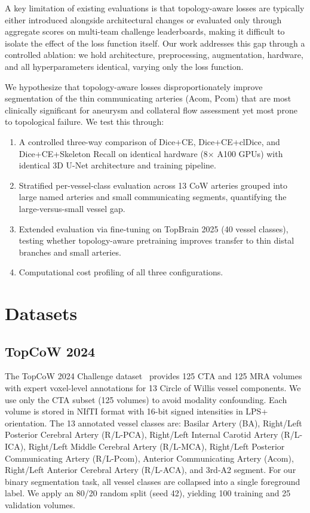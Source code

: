 \documentclass[conference]{IEEEtran}
\begin{document}
A key limitation of existing evaluations is that topology-aware losses are typically either introduced alongside architectural changes or evaluated only through aggregate scores on multi-team challenge leaderboards, making it difficult to isolate the effect of the loss function itself. Our work addresses this gap through a controlled ablation: we hold architecture, preprocessing, augmentation, hardware, and all hyperparameters identical, varying only the loss function.

We hypothesize that topology-aware losses disproportionately improve segmentation of the thin communicating arteries (Acom, Pcom) that are most clinically significant for aneurysm and collateral flow assessment yet most prone to topological failure. We test this through:
\begin{enumerate}
    \item A controlled three-way comparison of Dice+CE, Dice+CE+clDice, and Dice+CE+Skeleton Recall on identical hardware (8$\times$ A100 GPUs) with identical 3D U-Net architecture and training pipeline.
    \item Stratified per-vessel-class evaluation across 13 CoW arteries grouped into large named arteries and small communicating segments, quantifying the large-versus-small vessel gap.
    \item Extended evaluation via fine-tuning on TopBrain 2025 (40 vessel classes), testing whether topology-aware pretraining improves transfer to thin distal branches and small arteries.
    \item Computational cost profiling of all three configurations.
\end{enumerate}

\section{Datasets}

\subsection{TopCoW 2024}

The TopCoW 2024 Challenge dataset~\cite{yang2023} provides 125 CTA and 125 MRA volumes with expert voxel-level annotations for 13 Circle of Willis vessel components. We use only the CTA subset (125 volumes) to avoid modality confounding. Each volume is stored in NIfTI format with 16-bit signed intensities in LPS+ orientation. The 13 annotated vessel classes are: Basilar Artery (BA), Right/Left Posterior Cerebral Artery (R/L-PCA), Right/Left Internal Carotid Artery (R/L-ICA), Right/Left Middle Cerebral Artery (R/L-MCA), Right/Left Posterior Communicating Artery (R/L-Pcom), Anterior Communicating Artery (Acom), Right/Left Anterior Cerebral Artery (R/L-ACA), and 3rd-A2 segment. For our binary segmentation task, all vessel classes are collapsed into a single foreground label. We apply an 80/20 random split (seed 42), yielding 100 training and 25 validation volumes.
\end{document}
